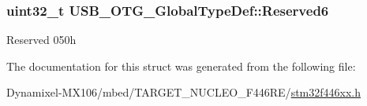 \subsubsection[{\texorpdfstring{Reserved6}{Reserved6}}]{\setlength{\rightskip}{0pt plus 5cm}uint32\+\_\+t U\+S\+B\+\_\+\+O\+T\+G\+\_\+\+Global\+Type\+Def\+::\+Reserved6}\hypertarget{struct_u_s_b___o_t_g___global_type_def_a4a273db791acbfdf89594c9d4005e7e1}{}\label{struct_u_s_b___o_t_g___global_type_def_a4a273db791acbfdf89594c9d4005e7e1}
Reserved 050h 

The documentation for this struct was generated from the following file\+:\begin{DoxyCompactItemize}
\item 
Dynamixel-\/\+M\+X106/mbed/\+T\+A\+R\+G\+E\+T\+\_\+\+N\+U\+C\+L\+E\+O\+\_\+\+F446\+R\+E/\hyperlink{stm32f446xx_8h}{stm32f446xx.\+h}\end{DoxyCompactItemize}
